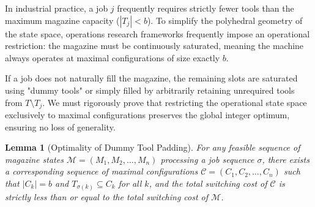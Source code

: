 \documentclass[11pt, a4paper]{book}
\newtheorem{lemma}[theorem]{Lemma}
\begin{document}
	In industrial practice, a job $j$ frequently requires strictly fewer tools than the maximum magazine capacity ($|T_j| < b$). To simplify the polyhedral geometry of the state space, operations research frameworks frequently impose an operational restriction: the magazine must be continuously saturated, meaning the machine always operates at maximal configurations of size exactly $b$. 
	
	If a job does not naturally fill the magazine, the remaining slots are saturated using "dummy tools" or simply filled by arbitrarily retaining unrequired tools from $T \setminus T_j$. We must rigorously prove that restricting the operational state space exclusively to maximal configurations preserves the global integer optimum, ensuring no loss of generality.
	
	\begin{lemma}[Optimality of Dummy Tool Padding]
		For any feasible sequence of magazine states $\mathcal{M} = (M_1, M_2, \dots, M_n)$ processing a job sequence $\sigma$, there exists a corresponding sequence of maximal configurations $\mathcal{C} = (C_1, C_2, \dots, C_n)$ such that $|C_k| = b$ and $T_{\sigma(k)} \subseteq C_k$ for all $k$, and the total switching cost of $\mathcal{C}$ is strictly less than or equal to the total switching cost of $\mathcal{M}$.
	\end{lemma}
	
\end{document}
